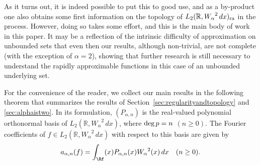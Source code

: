 \documentclass[12pt, reqno]{amsart}
\numberwithin{equation}{section}
\theoremstyle{plain}
\theoremstyle{definition}
\begin{document}
As it turns out, it is indeed possible to put this to good use, and as a by-product one also obtains some first information on the topology of ${L_2({{\mathbb R}},{W_\alpha}^2\,dx)_{\textup{ra}}}$ in the process. However, doing so takes some effort, and this is the main body of work in this paper. It may be a reflection of the intrinsic difficulty of approximation on unbounded sets that even then our results, although non-trivial, are not complete (with the exception of $\alpha=2$), showing that further research is still necessary to understand the rapidly approximable functions in this case of an unbounded underlying set.

For the convenience of the reader, we collect our main results in the following theorem that summarizes the results of Section~\ref{sec:regularityandtopology} and \ref{sec:alphaistwo}. In its formulation, ${({P_{\alpha,n}})}$ is the real-valued polynomial orthonormal basis of ${{L_2({{\mathbb R}}, {W_\alpha}^2\,dx)}}$, where $\textup{deg}\,p=n$ $(n\geq 0)$. The Fourier coefficients of $f\in {{L_2({{\mathbb R}}, {W_\alpha}^2\,dx)}}$ with respect to this basis are given by
\begin{equation*}
a_{\alpha,n}(f)=\int_\Rf(x)P_{\alpha,n}(x){W_\alpha}^{2}(x)\,dx\quad(n\geq 0).
\end{equation*}
\end{document}
